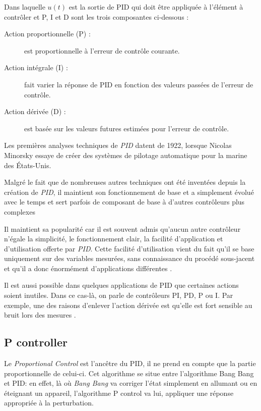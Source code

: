 \documentclass[a4paper,10pt]{report}
\begin{document}
Dans laquelle $u(t)$ est la sortie de PID qui doit être appliquée à l'élément à contrôler et P, I et D sont les trois composantes ci-dessous :
\begin{description}
\item[Action proportionnelle (P) :]
    est proportionnelle à l'erreur de contrôle courante.
\item[Action intégrale (I) :]
    fait varier la réponse de PID en fonction des valeurs passées de l'erreur de contrôle.
\item[Action dérivée (D) :]
    est basée sur les valeurs futures estimées pour l'erreur de contrôle.
\end{description}

Les premières analyses techniques de \emph{PID} datent de 1922, lorsque Nicolas Minorsky essaye de créer des systèmes de pilotage automatique pour la marine des États-Unis. \cite{minorsky1922directional}

Malgré le fait que de nombreuses autres techniques ont été inventées depuis la création de \emph{PID}, il maintient son fonctionnement de base et a simplement évolué avec le temps et sert parfois de composant de base à d'autres contrôleurs plus complexes \cite{ang2005pid} \cite{visioli2006practical}

Il maintient sa popularité car il est souvent admis qu'aucun autre contrôleur n'égale la simplicité, le fonctionnement clair, la facilité d'application et d'utilisation offerte par \emph{PID}. Cette facilité d'utilisation vient du fait qu'il se base uniquement sur des variables mesurées, sans connaissance du procédé sous-jacent et qu'il a donc énormément d'applications différentes \cite{bennett1993history}.

Il est aussi possible dans quelques applications de PID que certaines actions soient inutiles.
Dans ce cas-là, on parle de contrôleurs PI, PD, P ou I.
Par exemple, une des raisons d'enlever l'action dérivée est qu'elle est fort sensible au bruit lors des mesures \cite{svrcek2014real}.

\subsection{P controller}
Le \emph{Proportional Control} est l'ancêtre du PID, il ne prend en compte que la partie proportionnelle de celui-ci.
Cet algorithme se situe entre l'algorithme Bang Bang et PID:
en effet, là où \emph{Bang Bang} va corriger l'état simplement en allumant ou en éteignant un appareil, l'algorithme P control va lui, appliquer une réponse appropriée à la perturbation.
\end{document}
